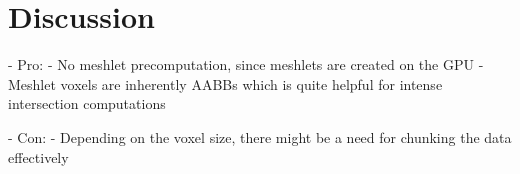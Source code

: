 \chapter{Discussion}


- Pro: 
    - No meshlet precomputation, since meshlets are created on the GPU
    - Meshlet voxels are inherently AABBs which is quite helpful for intense intersection computations %

- Con:
    - Depending on the voxel size, there might be a need for chunking the data effectively %
